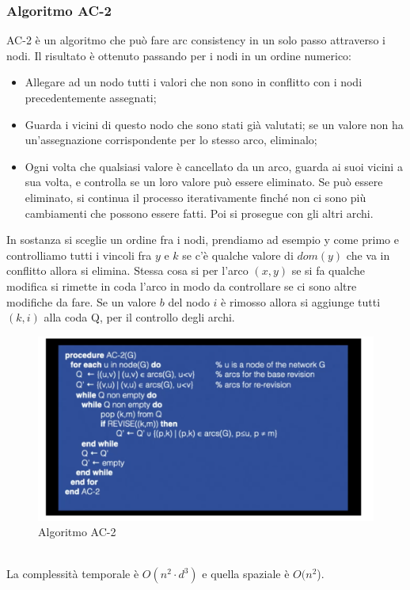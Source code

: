 \subsubsection{Algoritmo AC-2}
AC-2 è un algoritmo che può fare arc consistency in un solo passo attraverso i
nodi. Il risultato è ottenuto passando per i nodi in un ordine numerico:
\begin{itemize}
    \item Allegare ad un nodo tutti i valori che non sono in conflitto con i
          nodi precedentemente assegnati;
    \item Guarda i vicini di questo nodo che sono stati già valutati; se un
          valore non ha un'assegnazione corrispondente per lo stesso arco, eliminalo;
    \item Ogni volta che qualsiasi valore è cancellato da un arco, guarda ai
          suoi vicini a sua volta, e controlla se un loro valore può essere eliminato.
          Se può essere eliminato, si continua il processo iterativamente finché non
          ci sono più cambiamenti che possono essere fatti. Poi si prosegue con gli
          altri archi.
\end{itemize}
In sostanza si sceglie un ordine fra i nodi, prendiamo ad esempio y come primo e
controlliamo tutti i vincoli fra $y$ e $k$ se c'è qualche valore di $dom(y)$ che va in
conflitto allora si elimina. Stessa cosa si per l'arco $(x,y)$ se si fa qualche
modifica si rimette in coda l'arco in modo da controllare se ci sono altre
modifiche da fare. Se un valore $b$ del nodo $i$ è rimosso allora si aggiunge tutti
$(k,i)$ alla coda Q, per il controllo degli archi.
\begin{figure}[htp]
    \centering
    \includegraphics[width=13cm, keepaspectratio]{img/Cap3/ac-2.png}
    \caption{Algoritmo AC-2}
\end{figure}
\\La complessità temporale è $O(n^2 \cdot d^3)$ e quella spaziale è $O(n^2$).

